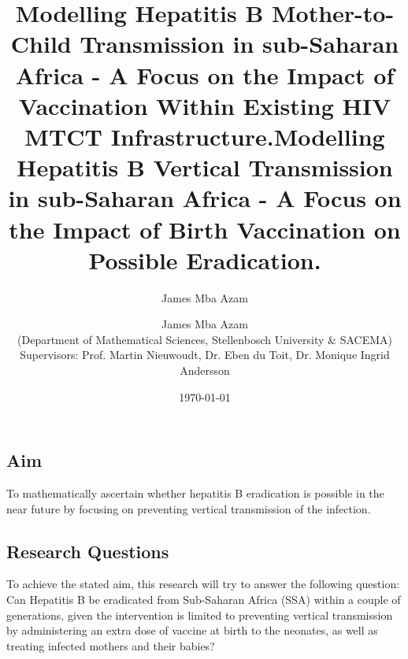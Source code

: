 \documentclass[11pt,a4paper]{article}
\author{James Mba Azam}
\title{Modelling Hepatitis B Mother-to-Child Transmission in sub-Saharan Africa - A Focus on the
	Impact of Vaccination Within Existing HIV MTCT Infrastructure.}
\begin{document}
	
\title{\textbf{Modelling Hepatitis B Vertical Transmission in sub-Saharan Africa - A Focus on the
		Impact of Birth Vaccination on Possible Eradication.}}
\date{\today}
\author{James Mba Azam\\ (Department of Mathematical Sciences, Stellenbosch University \& SACEMA)\\Supervisors: Prof. Martin Nieuwoudt, Dr. Eben du Toit, Dr. Monique Ingrid Andersson}
\maketitle
\subsection{Aim}
To mathematically ascertain whether  hepatitis B eradication is possible in the near future by focusing on preventing vertical transmission of the infection. 
\subsection{Research Questions}
To achieve the stated aim, this research  will try to answer the following question: Can Hepatitis B be eradicated from Sub-Saharan Africa (SSA) within a couple of generations, given the intervention is limited to preventing vertical transmission by administering an extra dose of vaccine at birth to the neonates, as well as treating infected mothers and their babies?


\end{document}
